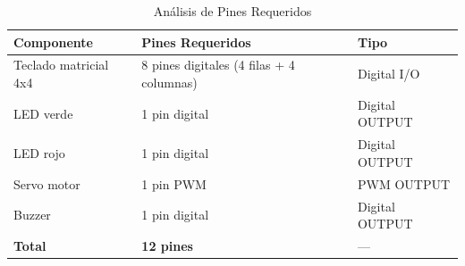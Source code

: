 

\begin{table}[h]
\caption{Análisis de Pines Requeridos}
\label{tab:Tabla_2_R1}
\centering
\renewcommand{\arraystretch}{1.2}
\begin{tabular}{p{2.5cm} p{3.5cm} p{2cm}}
\toprule
\textbf{Componente} & \textbf{Pines Requeridos} & \textbf{Tipo} \\
\midrule
Teclado matricial 4x4 & 8 pines digitales (4 filas + 4 columnas) & Digital I/O \\
LED verde & 1 pin digital & Digital OUTPUT \\
LED rojo & 1 pin digital & Digital OUTPUT \\
Servo motor & 1 pin PWM & PWM OUTPUT \\
Buzzer & 1 pin digital & Digital OUTPUT \\
\midrule
\textbf{Total} & \textbf{12 pines} & --- \\
\bottomrule
\end{tabular}
\end{table}
